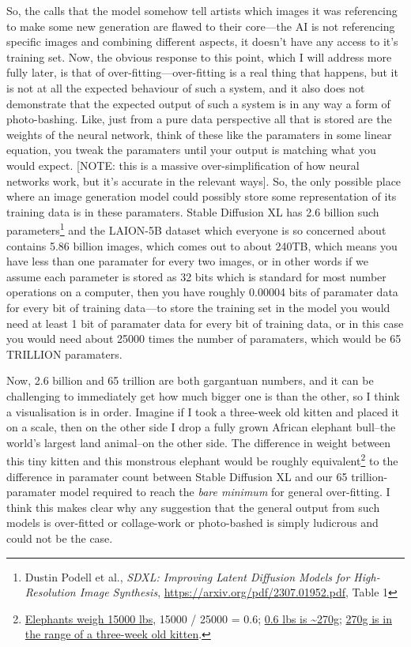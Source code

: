\documentclass[11pt]{article}
\begin{document}
So, the calls that the model somehow tell artists which images it was referencing to make some new generation are flawed to their core---the AI is not referencing specific images and combining different aspects, it doesn't have any access to it's training set. Now, the obvious response to this point, which I will address more fully later, is that of over-fitting---over-fitting is a real thing that happens, but it is not at all the expected behaviour of such a system, and it also does not demonstrate that the expected output of such a system is in any way a form of photo-bashing. Like, just from a pure data perspective all that is stored are the weights of the neural network, think of these like the paramaters in some linear equation, you tweak the paramaters until your output is matching what you would expect. [NOTE: this is a massive over-simplification of how neural networks work, but it's accurate in the relevant ways]. So, the only possible place where an image generation model could possibly store some representation of its training data is in these paramaters. Stable Diffusion XL has 2.6 billion such parameters\footnote{Dustin Podell et al., \emph{SDXL: Improving Latent Diffusion Models for High-Resolution Image Synthesis}, \url{https://arxiv.org/pdf/2307.01952.pdf}, Table 1} and the LAION-5B dataset which everyone is so concerned about contains 5.86 billion images, which comes out to about 240TB, which means you have less than one paramater for every two images, or in other words if we assume each parameter is stored as 32 bits which is standard for most number operations on a computer, then you have roughly 0.00004 bits of paramater data for every bit of training data---to store the training set in the model you would need at least 1 bit of paramater data for every bit of training data, or in this case you would need about 25000 times the number of paramaters, which would be 65 TRILLION paramaters.

Now, 2.6 billion and 65 trillion are both gargantuan numbers, and it can be challenging to immediately get how much bigger one is than the other, so I think a visualisation is in order. Imagine if I took a three-week old kitten and placed it on a scale, then on the other side I drop a fully grown African elephant bull--the world's largest land animal--on the other side. The difference in weight between this tiny kitten and this monstrous elephant would be roughly equivalent\footnote{\href{https://www.ifaw.org/journal/elephant-faq}{Elephants weigh 15000 lbs}, 15000 / 25000 = 0.6; \href{https://www.calculateme.com/weight/pounds/to-grams/0.6}{0.6 lbs is \textasciitilde{}270g}; \href{https://www.untamedcatfood.com/blogs/nutrition/kitten-weight-chart-kg}{270g is in the range of a three-week old kitten}.} to the difference in paramater count between Stable Diffusion XL and our 65 trillion-paramater model required to reach the \emph{bare minimum} for general over-fitting. I think this makes clear why any suggestion that the general output from such models is over-fitted or collage-work or photo-bashed is simply ludicrous and could not be the case.
\end{document}
